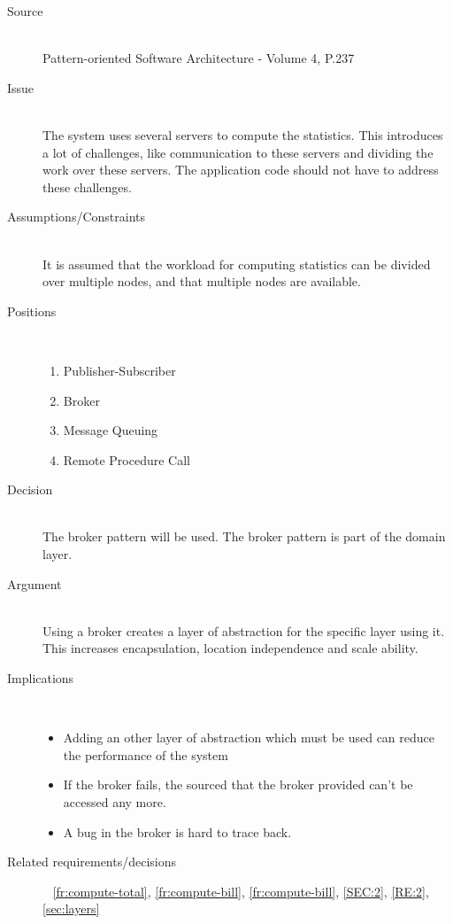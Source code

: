 \begin{description}
\item [Source]~\\
Pattern-oriented Software Architecture - Volume 4, P.237 \cite{wiley-4}

\item [Issue]~\\
The system uses several servers to compute the statistics. This introduces a lot of challenges, like communication to these servers and dividing the work over these servers. The application code should not have to address these challenges.

\item [Assumptions/Constraints]~\\
It is assumed that the workload for computing statistics can be divided over multiple nodes, and that multiple nodes are available.

\item [Positions]~
\begin{enumerate}
\item Publisher-Subscriber
\item Broker 
\item Message Queuing %
\item Remote Procedure Call
\end{enumerate}


\item [Decision]~\\
The broker pattern will be used. The broker pattern is part of the domain layer.

\item [Argument]~\\
Using a broker creates a layer of abstraction for the specific layer using it. This increases encapsulation, location independence and scale ability.

\item [Implications]~\\ 
\begin{itemize}
\item Adding an other layer of abstraction which must be used can reduce the performance of the system
\item If the broker fails, the sourced that the broker provided can't be accessed any more.
\item A bug in the broker is hard to trace back.
\end{itemize}

\item [Related requirements/decisions]~
\ref{fr:compute-total}, \ref{fr:compute-bill}, \ref{fr:compute-bill}, \ref{SEC:2}, \ref{RE:2}, \ref{sec:layers}
\end{description}

